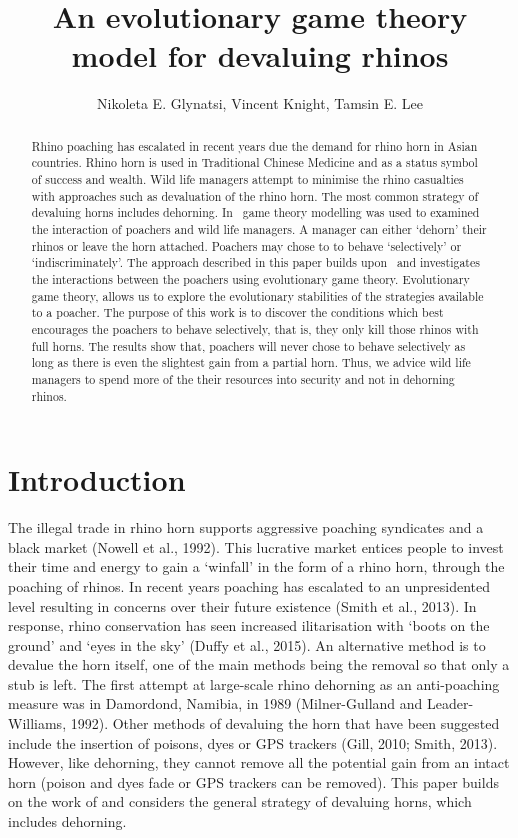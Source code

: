 \documentclass[10pt]{article}
\title{An evolutionary game theory model for devaluing rhinos}
\author{Nikoleta E. Glynatsi, Vincent Knight, Tamsin E. Lee} %
\date{}
\begin{document}
\maketitle

\begin{abstract}

Rhino poaching has escalated in recent years due the demand for rhino horn in 
Asian countries. Rhino horn is used in Traditional Chinese Medicine and as a 
status symbol of success and wealth. Wild life managers attempt to minimise
the rhino casualties with approaches such as devaluation of the rhino horn. 
The  most common strategy of devaluing horns includes dehorning. In~\cite{Lee}
game theory modelling was used to examined the interaction of poachers and
wild life managers.  A manager can either `dehorn' their rhinos or leave the
horn attached. Poachers may chose to to behave `selectively' or `indiscriminately'.
The approach described in this paper builds upon~\cite{Lee} and investigates 
the interactions  between the poachers using evolutionary game theory. 
Evolutionary game theory, allows us to explore the evolutionary stabilities 
of the strategies available to a poacher. The purpose of this work is to discover
the conditions which best  encourages the poachers to behave selectively, that
is, they only kill those rhinos with full horns.  The results show that, poachers
will never chose to behave selectively as long as there is even the slightest
gain from a partial horn. Thus, we advice wild life managers to spend more of
the their resources into security and not in dehorning rhinos.
\end{abstract}

\section{Introduction}\label{section:introduction}

The illegal trade in rhino horn supports aggressive poaching syndicates and a 
black market (Nowell et al., 1992). This lucrative market entices people to invest
their time and energy to gain a `winfall' in the form of a rhino horn, through the 
poaching of rhinos. In recent years poaching has escalated to an unpresidented 
level resulting in concerns over their future existence (Smith et al., 2013). In 
response, rhino conservation has seen increased  ilitarisation with `boots on the 
ground' and `eyes in the sky' (Duffy et al., 2015). An alternative method is to 
devalue the horn itself, one of the main  methods being the removal so that only
a stub is left. The first attempt at large-scale rhino dehorning as an anti-poaching
measure was in Damordond,  Namibia, in 1989 (Milner-Gulland and Leader-Williams,
1992). Other methods of devaluing the horn that have been suggested include
the insertion of poisons, dyes or GPS trackers (Gill, 2010; Smith, 2013). However, 
like dehorning, they cannot remove all the potential gain from an intact horn 
(poison and dyes fade or GPS trackers can be removed). This paper builds on 
the work of \cite{Lee} and considers the general strategy of devaluing horns,
which includes dehorning.
\end{document}
